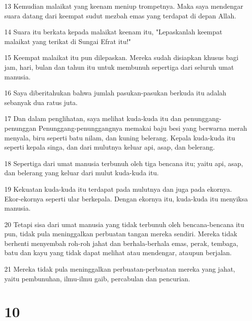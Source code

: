 \par 13 Kemudian malaikat yang keenam meniup trompetnya. Maka saya mendengar suara datang dari keempat sudut mezbah emas yang terdapat di depan Allah.
\par 14 Suara itu berkata kepada malaikat keenam itu, "Lepaskanlah keempat malaikat yang terikat di Sungai Efrat itu!"
\par 15 Keempat malaikat itu pun dilepaskan. Mereka sudah disiapkan khusus bagi jam, hari, bulan dan tahun itu untuk membunuh sepertiga dari seluruh umat manusia.
\par 16 Saya diberitahukan bahwa jumlah pasukan-pasukan berkuda itu adalah sebanyak dua ratus juta.
\par 17 Dan dalam penglihatan, saya melihat kuda-kuda itu dan penunggang-penunggan Penunggang-penunggangnya memakai baju besi yang berwarna merah menyala, biru seperti batu nilam, dan kuning belerang. Kepala kuda-kuda itu seperti kepala singa, dan dari mulutnya keluar api, asap, dan belerang.
\par 18 Sepertiga dari umat manusia terbunuh oleh tiga bencana itu; yaitu api, asap, dan belerang yang keluar dari mulut kuda-kuda itu.
\par 19 Kekuatan kuda-kuda itu terdapat pada mulutnya dan juga pada ekornya. Ekor-ekornya seperti ular berkepala. Dengan ekornya itu, kuda-kuda itu menyiksa manusia.
\par 20 Tetapi sisa dari umat manusia yang tidak terbunuh oleh bencana-bencana itu pun, tidak pula meninggalkan perbuatan tangan mereka sendiri. Mereka tidak berhenti menyembah roh-roh jahat dan berhala-berhala emas, perak, tembaga, batu dan kayu yang tidak dapat melihat atau mendengar, ataupun berjalan.
\par 21 Mereka tidak pula meninggalkan perbuatan-perbuatan mereka yang jahat, yaitu pembunuhan, ilmu-ilmu gaib, percabulan dan pencurian.

\chapter{10}

